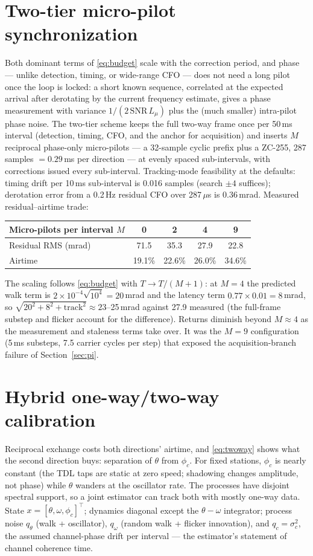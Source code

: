 \documentclass[10pt]{article}
\begin{document}
\section{Two-tier micro-pilot synchronization}
\label{sec:micro}
Both dominant terms of \eqref{eq:budget} scale with the correction
period, and phase --- unlike detection, timing, or wide-range CFO ---
does not need a long pilot once the loop is locked: a short known
sequence, correlated at the expected arrival after derotating by the
current frequency estimate, gives a phase measurement with variance
$1/(2\,\mathrm{SNR}\,L_\mu)$ plus the (much smaller) intra-pilot phase
noise. The two-tier scheme keeps the full two-way frame once per 50\,ms
interval (detection, timing, CFO, and the anchor for acquisition) and
inserts $M$ reciprocal phase-only micro-pilots --- a 32-sample cyclic
prefix plus a ZC-255, 287 samples $=0.29$\,ms per direction --- at evenly
spaced sub-intervals, with corrections issued every sub-interval.
Tracking-mode feasibility at the defaults: timing drift per 10\,ms
sub-interval is 0.016 samples (search $\pm4$ suffices); derotation error
from a 0.2\,Hz residual CFO over 287\,$\mu$s is 0.36\,mrad. Measured
residual--airtime trade:
\begin{center}
\begin{tabular}{lcccc}
\toprule
Micro-pilots per interval $M$ & 0 & 2 & 4 & 9\\
\midrule
Residual RMS (mrad) & 71.5 & 35.3 & 27.9 & 22.8\\
Airtime & 19.1\% & 22.6\% & 26.0\% & 34.6\%\\
\bottomrule
\end{tabular}
\end{center}
The scaling follows \eqref{eq:budget} with $T\to T/(M{+}1)$: at $M=4$
the predicted walk term is $2\times10^{-4}\sqrt{10^4}=20$\,mrad and the
latency term $0.77\times0.01=8$\,mrad, so $\sqrt{20^2+8^2+\text{track}^2}
\approx23$--25\,mrad against 27.9 measured (the full-frame substep and
flicker account for the difference). Returns diminish beyond $M\approx4$
as the measurement and staleness terms take over. It was the $M=9$
configuration (5\,ms substeps, 7.5 carrier cycles per step) that exposed
the acquisition-branch failure of Section~\ref{sec:pi}.

\section{Hybrid one-way/two-way calibration}
\label{sec:hybrid}
Reciprocal exchange costs both directions' airtime, and
\eqref{eq:twoway} shows what the second direction buys: separation of
$\theta$ from $\phi_c$. For fixed stations, $\phi_c$ is nearly constant
(the TDL taps are static at zero speed; shadowing changes amplitude, not
phase) while $\theta$ wanders at the oscillator rate. The processes have
disjoint spectral support, so a joint estimator can track both with
mostly one-way data. State $x=[\theta,\omega,\phi_c]^\top$; dynamics
diagonal except the $\theta\!-\!\omega$ integrator; process noise
$q_\theta$ (walk + oscillator), $q_\omega$ (random walk + flicker
innovation), and $q_c=\sigma_c^2$, the assumed channel-phase drift per
interval --- the estimator's statement of channel coherence time.
\end{document}
